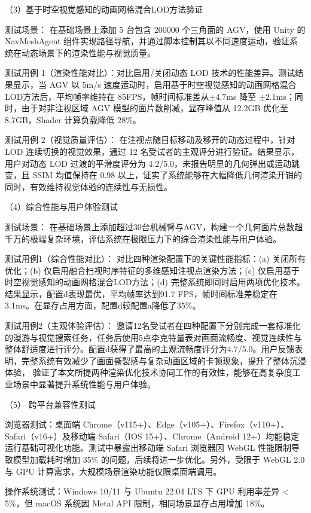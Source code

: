 （3）基于时空视觉感知的动画网格混合LOD方法验证

测试场景： 在基础场景上添加 5 台包含 200000 个三角面的 AGV，使用 Unity 的 NavMeshAgent 组件实现路径导航，并通过脚本控制其以不同速度运动，验证系统在动态场景下的渲染性能与视觉质量。

测试用例 1（渲染性能对比）：对比启用/关闭动态 LOD 技术的性能差异。测试结果显示，当 AGV 以 5m/s 速度运动时，启用基于时空视觉感知的动画网格混合LOD方法后，平均帧率维持在 85FPS，帧时间标准差从$\pm 4.7$ms 降至 $\pm 2.1$ms；同时，由于对非注视区域 AGV 模型的面片数削减，显存峰值从 12.2GB 优化至 8.7GB，Shader 计算负载降低 28\%。

测试用例 2（视觉质量评估）： 在注视点随目标移动及移开的动态过程中，针对 LOD 连续切换的视觉效果，通过 12 名受试者的主观评分进行验证。结果显示，用户对动态 LOD 过渡的平滑度评分为 4.2/5.0，未报告明显的几何弹出或运动跳变，且 SSIM 均值保持在 0.98 以上，证实了系统能够在大幅降低几何渲染开销的同时，有效维持视觉体验的连续性与无损性。


（4）综合性能与用户体验测试

测试场景： 在基础场景上添加超过30台机械臂与AGV，构建一个几何面片总数超千万的极端复杂环境，评估系统在极限压力下的综合渲染性能与用户体验。

测试用例1（综合性能对比）： 对比四种渲染配置下的关键性能指标：(a) 关闭所有优化；(b) 仅启用融合扫视时序特征的多维感知注视点渲染方法；(c) 仅启用基于时空视觉感知的动画网格混合LOD方法；(d) 完整系统即同时启用两项优化技术。结果显示，配置d表现最优，平均帧率达到91.7 FPS，帧时间标准差稳定在3.1ms。在显存占用方面，配置d较配置a降低了35\%。

测试用例2（主观体验评估）： 邀请12名受试者在四种配置下分别完成一套标准化的漫游与视觉搜索任务，任务后使用5点李克特量表对画面流畅度、视觉连续性与整体舒适度进行评分。配置d获得了最高的主观流畅度评分为4.7/5.0。用户反馈表明，完整系统有效减少了画面撕裂感与复杂动画区域的卡顿现象，提升了整体沉浸体验，
验证了本文所提两种渲染优化技术协同工作的有效性，能够在高复杂度工业场景中显著提升系统性能与用户体验。

（5） 跨平台兼容性测试

浏览器测试：桌面端 Chrome（v115+）、Edge（v105+）、Firefox（v110+）、Safari（v16+）及移动端 Safari（IOS 15+）、Chrome（Android 12+）均能稳定运行基础可视化功能。测试中暴露出移动端 Safari 浏览器因 WebGL 性能限制导致模型加载耗时增加 35\% 的问题，后续将进一步优化。另外，受限于 WebGL 2.0 与 GPU 计算需求，大规模场景渲染功能仅限桌面端调用。

操作系统测试：Windows 10/11 与 Ubuntu 22.04 LTS 下 GPU 利用率差异 < 5\%，但 macOS 系统因 Metal API 限制，相同场景显存占用增加 18\%。

